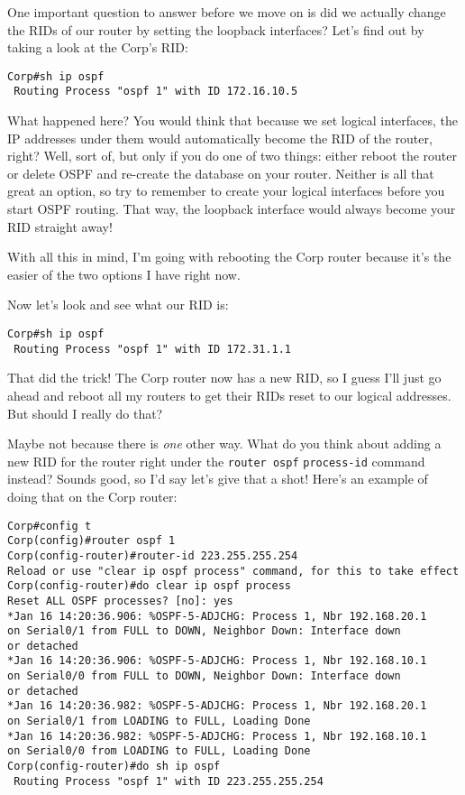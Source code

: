 \protect\hypertarget{c18.xhtmlux5cux23Page_764}{}{}One important
question to answer before we move on is did we actually change the RIDs
of our router by setting the loopback interfaces? Let's find out by
taking a look at the Corp's RID:

\begin{verbatim}
Corp#sh ip ospf
 Routing Process "ospf 1" with ID 172.16.10.5
\end{verbatim}

What happened here? You would think that because we set logical
interfaces, the IP addresses under them would automatically become the
RID of the router, right? Well, sort of, but only if you do one of two
things: either reboot the router or delete OSPF and re-create the
database on your router. Neither is all that great an option, so try to
remember to create your logical interfaces before you start OSPF
routing. That way, the loopback interface would always become your RID
straight away!

With all this in mind, I'm going with rebooting the Corp router because
it's the easier of the two options I have right now.

Now let's look and see what our RID is:

\begin{verbatim}
Corp#sh ip ospf
 Routing Process "ospf 1" with ID 172.31.1.1
\end{verbatim}

That did the trick! The Corp router now has a new RID, so I guess I'll
just go ahead and reboot all my routers to get their RIDs reset to our
logical addresses. But should I really do that?

Maybe not because there is \emph{one} other way. What do you think about
adding a new RID for the router right under the \texttt{router\ ospf}
\texttt{process-id} command instead? Sounds good, so I'd say let's give
that a shot! Here's an example of doing that on the Corp router:

\begin{verbatim}
Corp#config t
Corp(config)#router ospf 1
Corp(config-router)#router-id 223.255.255.254
Reload or use "clear ip ospf process" command, for this to take effect
Corp(config-router)#do clear ip ospf process
Reset ALL OSPF processes? [no]: yes
*Jan 16 14:20:36.906: %OSPF-5-ADJCHG: Process 1, Nbr 192.168.20.1
on Serial0/1 from FULL to DOWN, Neighbor Down: Interface down
or detached
*Jan 16 14:20:36.906: %OSPF-5-ADJCHG: Process 1, Nbr 192.168.10.1
on Serial0/0 from FULL to DOWN, Neighbor Down: Interface down
or detached
*Jan 16 14:20:36.982: %OSPF-5-ADJCHG: Process 1, Nbr 192.168.20.1
on Serial0/1 from LOADING to FULL, Loading Done
*Jan 16 14:20:36.982: %OSPF-5-ADJCHG: Process 1, Nbr 192.168.10.1
on Serial0/0 from LOADING to FULL, Loading Done
Corp(config-router)#do sh ip ospf
 Routing Process "ospf 1" with ID 223.255.255.254
\end{verbatim}


